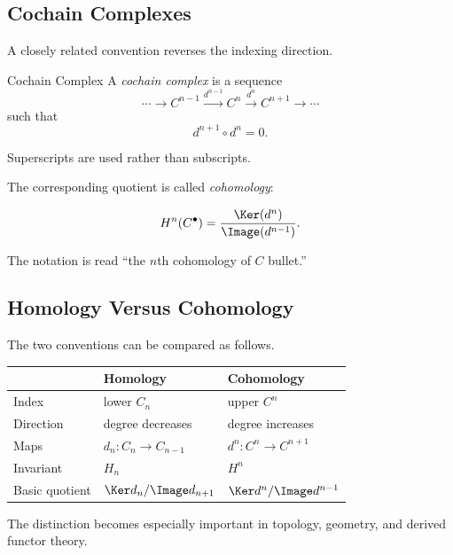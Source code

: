 \subsection{Cochain Complexes}
\label{subsec:cochain-complexes}

A closely related convention reverses the indexing direction.

\begin{definitionbox}{Cochain Complex}
A \emph{cochain complex} is a sequence
\[ \cdots\longrightarrow C^{n-1}
\xrightarrow{d^{n-1}}C^n
\xrightarrow{d^n}C^{n+1}
\longrightarrow\cdots \]
such that
\[ d^{n+1}\circ d^n=0. \]
\end{definitionbox}

Superscripts are used rather than subscripts.

The corresponding quotient is called \emph{cohomology}:

\[ H^n(C^\bullet)=\frac{\Ker(d^n)}{\Image(d^{n-1})}. \]

The notation is read ``the \(n\)th cohomology of \(C\) bullet.''

\subsection{Homology Versus Cohomology}
\label{subsec:homology-vs-cohomology}

The two conventions can be compared as follows.

\begin{center}
\begin{tabularx}{0.94\textwidth}{@{}lXX@{}}
\toprule
 & \textbf{Homology} & \textbf{Cohomology}\\
\midrule
Index & lower \(C_n\) & upper \(C^n\)\\
Direction & degree decreases & degree increases\\
Maps & \(d_n:C_n\to C_{n-1}\) & \(d^n:C^n\to C^{n+1}\)\\
Invariant & \(H_n\) & \(H^n\)\\
Basic quotient &
\(\Ker d_n/\Image d_{n+1}\) &
\(\Ker d^n/\Image d^{n-1}\)\\
\bottomrule
\end{tabularx}
\end{center}

The distinction becomes especially important in topology, geometry, and
derived functor theory.

